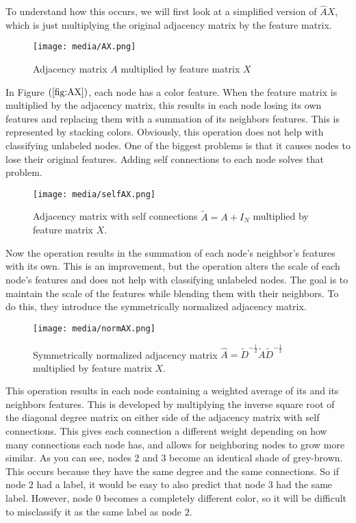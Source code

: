 To understand how this occurs, we will first look at a simplified version of $\hat{A}X$, which is just multiplying the original adjacency matrix by the feature matrix.  


\begin{figure}[h]
	\centering
	\texttt{[image: media/AX.png]}
	\caption{Adjacency matrix $A$ multiplied by feature matrix $X$} 
	\label{fig:AX}
\end{figure}


In Figure $(\ref{fig:AX})$, each node has a color feature. When the feature matrix is multiplied by the adjacency matrix, this results in each node losing its own features and replacing them with a summation of its neighbors features. This is represented by stacking colors. Obviously, this operation does not help with classifying unlabeled nodes. One of the biggest problems is that it causes nodes to lose their original features. Adding self connections to each node solves that problem.


\begin{figure}[h]
	\centering
	\texttt{[image: media/selfAX.png]}
	\caption{Adjacency matrix with self connections $\tilde{A} = A + I_N$ multiplied by feature matrix $X$.} 
	\label{fig:selfAX}
\end{figure}


Now the operation results in the summation of each node's neighbor's features with its own. This is an improvement, but the operation alters the scale of each node's features and does not help with classifying unlabeled nodes. The goal is to maintain the scale of the features while blending them with their neighbors. To do this, they introduce the symmetrically normalized adjacency matrix.


\begin{figure}[h]
	\centering
	\texttt{[image: media/normAX.png]}
	\caption{Symmetrically normalized adjacency matrix $\hat{A} = \tilde{D}^{-\frac{1}{2}}\tilde{A}\tilde{D}^{-\frac{1}{2}}$ multiplied by feature matrix $X$.} 
	\label{fig:normAX}
\end{figure}


This operation results in each node containing a weighted average of its and its neighbors features. This is developed by multiplying the inverse square root of the diagonal degree matrix on either side of the adjacency matrix with self connections. This gives each connection a different weight depending on how many connections each node has, and allows for neighboring nodes to grow more similar. As you can see, nodes $2$ and $3$ become an identical shade of grey-brown. This occurs because they have the same degree and the same connections. So if node $2$ had a label, it would be easy to also predict that node $3$ had the same label. However, node $0$ becomes a completely different color, so it will be difficult to misclassify it as the same label as node $2$.